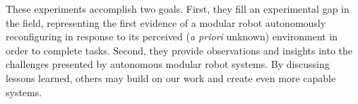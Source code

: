 \documentclass[journal]{IEEEtran}
\begin{document}
These experiments accomplish two goals.  First, they fill an experimental
gap in the field, representing the first evidence of a modular robot autonomously reconfiguring in response to its perceived (\textit{a priori} unknown) environment in order to complete tasks.  Second, they provide observations and insights into the challenges presented by autonomous modular robot systems.  By discussing lessons learned, others may build on our work and create even more capable systems. 


\end{document}
